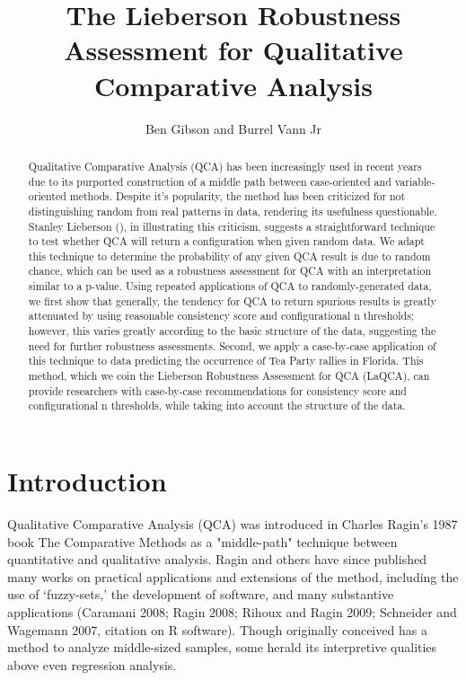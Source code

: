 \documentclass[]{article}
\title{The Lieberson Robustness Assessment for Qualitative Comparative Analysis}
\author{Ben Gibson and Burrel Vann Jr}
\begin{document}
\doublespace
\maketitle

\begin{abstract}

Qualitative Comparative Analysis (QCA) has been increasingly used in recent years due to its purported construction of a middle path between case-oriented and variable-oriented methods. Despite it's popularity, the method has been criticized for not distinguishing random from real patterns in data, rendering its usefulness questionable. Stanley Lieberson (), in illustrating this criticism, suggests a straightforward technique to test whether QCA will return a configuration when given random data. We adapt this technique to determine the probability of any given QCA result is due to random chance, which can be used as a robustness assessment for QCA with an interpretation similar to a p-value. Using repeated applications of QCA to randomly-generated data, we first show that generally, the tendency for QCA to return spurious results is greatly attenuated by using reasonable consistency score and configurational n thresholds; however, this varies greatly according to the basic structure of the data, suggesting the need for further robustness assessments. Second, we apply a case-by-case application of this technique to data predicting the occurrence of Tea Party rallies in Florida. This method, which we coin the Lieberson Robustness Assessment for QCA (LaQCA), can provide researchers with case-by-case recommendations for consistency score and configurational n thresholds, while taking into account the structure of the data.


\end{abstract}

\section{Introduction}


Qualitative Comparative Analysis (QCA) was introduced in Charles Ragin's 1987 book The Comparative Methods as a "middle-path" technique between quantitative and qualitative analysis. Ragin and others have since published many works on practical applications and extensions of the method, including the use of `fuzzy-sets,' the development of software, and many substantive applications (Caramani 2008; Ragin 2008; Rihoux and Ragin 2009; Schneider and Wagemann 2007, citation on R software). Though originally conceived has a method to analyze middle-sized samples, some herald its interpretive qualities above even regression analysis.
\end{document}
